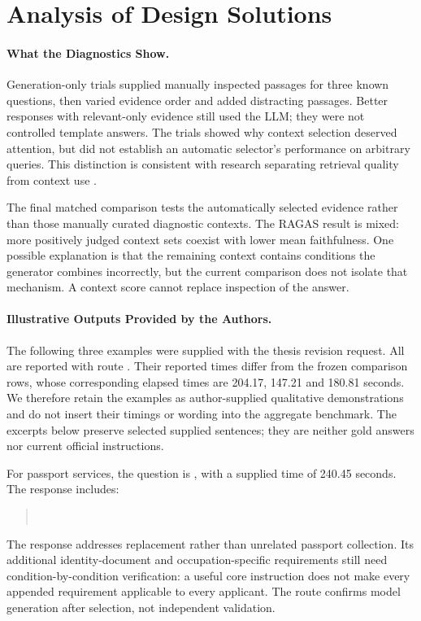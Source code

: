 \section{Analysis of Design Solutions}
\paragraph{What the Diagnostics Show.}
Generation-only trials supplied manually inspected passages for three known questions, then varied evidence order and added distracting passages. Better responses with relevant-only evidence still used the LLM; they were not controlled template answers. The trials showed why context selection deserved attention, but did not establish an automatic selector's performance on arbitrary queries. This distinction is consistent with research separating retrieval quality from context use \cite{trase,lostmiddle}.

The final matched comparison tests the automatically selected evidence rather than those manually curated diagnostic contexts. The RAGAS result is mixed: more positively judged context sets coexist with lower mean faithfulness. One possible explanation is that the remaining context contains conditions the generator combines incorrectly, but the current comparison does not isolate that mechanism. A context score cannot replace inspection of the answer.

\paragraph{Illustrative Outputs Provided by the Authors.}
The following three examples were supplied with the thesis revision request. All are reported with route . Their reported times differ from the frozen comparison rows, whose corresponding elapsed times are 204.17, 147.21 and 180.81 seconds. We therefore retain the examples as author-supplied qualitative demonstrations and do not insert their timings or wording into the aggregate benchmark. The excerpts below preserve selected supplied sentences; they are neither gold answers nor current official instructions.

For passport services, the question is , with a supplied time of 240.45 seconds. The response includes:
\begin{quote}
\\
\end{quote}
The response addresses replacement rather than unrelated passport collection. Its additional identity-document and occupation-specific requirements still need condition-by-condition verification: a useful core instruction does not make every appended requirement applicable to every applicant. The route confirms model generation after selection, not independent validation.

